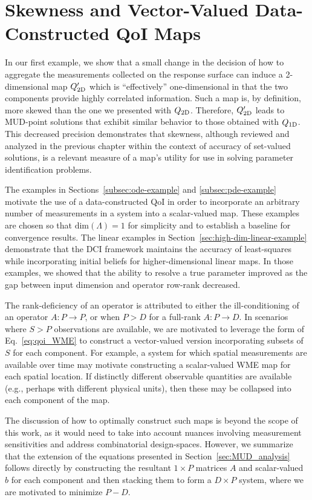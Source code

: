 \section{Skewness and Vector-Valued Data-Constructed QoI Maps}
In our first example, we show that a small change in the decision of how to aggregate the measurements collected on the response surface can induce a 2-dimensional map $Q_\text{2D}^\prime$ which is ``effectively'' one-dimensional in that the two components provide highly correlated information.
Such a map is, by definition, more skewed than the one we presented with $Q_\text{2D}$.
Therefore, $Q_\text{2D}^\prime$ leads to MUD-point solutions that exhibit similar behavior to those obtained with $Q_\text{1D}$.
This decreased precision demonstrates that skewness, although reviewed and analyzed in the previous chapter within the context of accuracy of set-valued solutions, is a relevant measure of a map's utility for use in solving parameter identification problems.

The examples in Sections~\ref{subsec:ode-example} and \ref{subsec:pde-example} motivate the use of a data-constructed QoI in order to incorporate an arbitrary number of measurements in a system into a scalar-valued map.
These examples are chosen so that $\text{dim}({\Lambda}) = 1$ for simplicity and to establish a baseline for convergence results.
The linear examples in Section~\ref{sec:high-dim-linear-example} demonstrate that the DCI framework maintains the accuracy of least-squares while incorporating initial beliefs for higher-dimensional linear maps.
In those examples, we showed that the ability to resolve a true parameter improved as the gap between input dimension and operator row-rank decreased.

The rank-deficiency of an operator is attributed to either the ill-conditioning of an operator $A:P\to P$, or when $P>D$ for a full-rank $A:P\to D$.
In scenarios where $S>P$ observations are available, we are motivated to leverage the form of Eq.~\eqref{eq:qoi_WME} to construct a vector-valued version incorporating subsets of $S$ for each component.
For example, a system for which spatial measurements are available over time may motivate constructing a scalar-valued WME map for each spatial location.
If distinctly different observable quantities are available (e.g., perhaps with different physical units), then these may be collapsed into each component of the map.

The discussion of how to optimally construct such maps is beyond the scope of this work, as it would need to take into account nuances involving measurement sensitivities and address combinatorial design-spaces.
However, we summarize that the extension of the equations presented in Section~\ref{sec:MUD_analysis} follows directly by constructing the resultant $1\times P$ matrices $A$ and scalar-valued $b$ for each component and then stacking them to form a $D\times P$ system, where we are motivated to minimize $P-D$.
